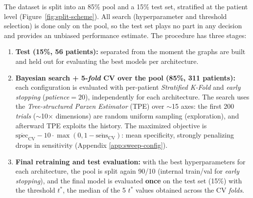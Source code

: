 \documentclass[10pt,a4paper,twocolumn,twoside]{article}
\begin{document}
The dataset is split into an 85\% pool and a 15\% test set, stratified at the
patient level (Figure~\ref{fig:split-scheme}). All search (hyperparameter and
threshold selection) is done only on the pool, so the test set plays no part in any decision and provides an
unbiased performance estimate. The procedure has three stages:

\begin{enumerate}\itemsep1pt
  \item \textbf{Test (15\%, 56 patients):} separated from the moment the graphs are built and held out
        for evaluating the best models per architecture.
  \item \textbf{Bayesian search + 5-\textit{fold} CV over the pool (85\%, 311 patients):} each
        configuration is evaluated with per-patient \textit{Stratified K-Fold} and \textit{early stopping}
        (\textit{patience}$=\!20$), independently for each architecture. The search uses the
        \textit{Tree-structured Parzen Estimator} (TPE) over $\sim$15 axes: the first 200
        \textit{trials} ($\sim$10$\times$ dimensions) are random uniform sampling (exploration), and
        afterward TPE exploits the history. The maximized objective is
        $\overline{\text{spec}}_{\text{CV}} - 10\cdot\max(0, 1-\overline{\text{sens}}_{\text{CV}})$:
        mean specificity, strongly penalizing drops in sensitivity (Appendix
        \ref{app:sweep-config}).
  \item \textbf{Final retraining and test evaluation:} with the best hyperparameters for each
        architecture, the pool is split again 90/10 (internal train/val for \textit{early stopping}),
        and the final model is evaluated \textbf{once} on the test set (15\%) with the threshold $t^*$,
        the median of the 5 $t^*$ values obtained across the CV \textit{folds}.
\end{enumerate}
\end{document}
